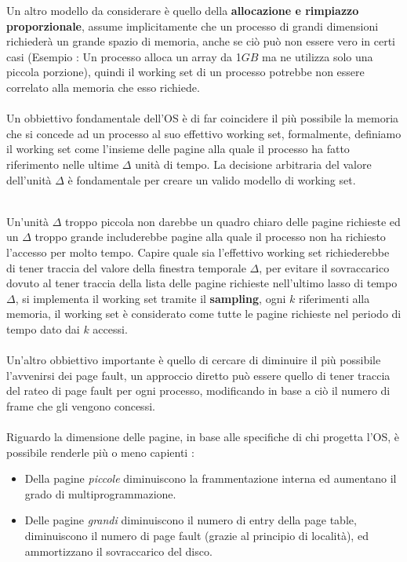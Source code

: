 \documentclass[12pt, letterpaper]{article}
\newcommand{\acc}{\\\hphantom{}\\}
\begin{document}
Un altro modello da considerare è quello della \textbf{allocazione e rimpiazzo proporzionale}, assume implicitamente 
che un processo di grandi dimensioni richiederà un grande spazio di memoria, anche se ciò può non essere vero in certi 
casi (Esempio : Un processo alloca un array da 1\(GB\) ma ne utilizza solo una piccola porzione), quindi il working set di un 
processo potrebbe non essere correlato alla memoria che esso richiede.\acc Un obbiettivo fondamentale dell'OS è di 
far coincidere il più possibile la memoria che si concede ad un processo al suo effettivo working set, formalmente, definiamo 
il working set come l'insieme delle pagine alla quale il processo ha fatto riferimento nelle ultime \(\Delta\) unità di tempo. 
La decisione arbitraria del valore dell'unità \(\Delta\) è fondamentale per creare un valido modello di working set.\\\begin{figure}[h]
\end{figure}\\
Un'unità \(\Delta\) troppo piccola non darebbe un quadro chiaro delle pagine richieste ed un \(\Delta\) troppo grande 
includerebbe pagine alla quale il processo non ha richiesto l'accesso per molto tempo. Capire quale sia l'effettivo 
working set richiederebbe di tener traccia del valore della finestra temporale \(\Delta\), per evitare il sovraccarico 
dovuto al tener traccia della lista delle pagine richieste nell'ultimo lasso di tempo \(\Delta\), si implementa il 
working set tramite il \textbf{sampling}, ogni \(k\) riferimenti alla memoria, il working set è considerato come tutte le 
pagine richieste nel periodo di tempo dato dai \(k\) accessi.\acc 
Un'altro obbiettivo importante è quello di cercare di diminuire il più possibile l'avvenirsi dei page fault, un approccio diretto 
può essere quello di tener traccia del rateo di page fault per ogni processo, modificando in base a ciò il numero di 
frame che gli vengono concessi. \acc 
Riguardo la dimensione delle pagine, in base alle specifiche di chi progetta l'OS, è possibile renderle più o meno capienti : \begin{itemize}
    \item Della pagine \textit{piccole} diminuiscono la frammentazione interna ed aumentano il grado di multiprogrammazione.
    \item Delle pagine \textit{grandi} diminuiscono il numero di entry della page table, diminuiscono il numero di page 
    fault (grazie al principio di località), ed ammortizzano il sovraccarico del disco.
\end{itemize}
\end{document}
